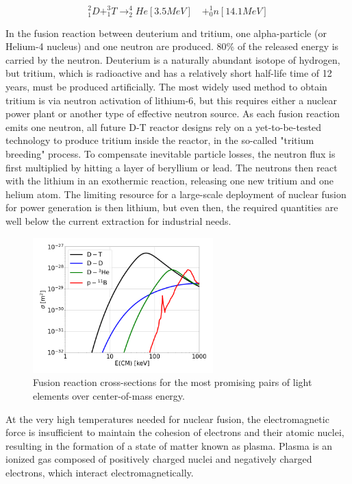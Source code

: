 \begin{equation}
	^2_1D + ^3_1T \rightarrow ^4_2He [3.5MeV] \quad + ^1_0n [14.1 MeV]
\end{equation}

In the fusion reaction between deuterium and tritium, one alpha-particle (or Helium-4 nucleus) and one neutron are produced. 80\% of the released energy is carried by the neutron. Deuterium is a naturally abundant isotope of hydrogen, but tritium, which is radioactive and has a relatively short half-life time of 12 years, must be produced artificially. The most widely used method to obtain tritium is via neutron activation of lithium-6, but this requires either a nuclear power plant or another type of effective neutron source. As each fusion reaction emits one neutron, all future D-T reactor designs rely on a yet-to-be-tested technology to produce tritium inside the reactor, in the so-called "tritium breeding" process. To compensate inevitable particle losses, the neutron flux is first multiplied by hitting a layer of beryllium or lead. The neutrons then react with the lithium in an exothermic reaction, releasing one new tritium and one helium atom. The limiting resource for a large-scale deployment of nuclear fusion for power generation is then lithium, but even then, the required quantities are well below the current extraction for industrial needs. \\


\begin{figure}[H]
	\centering
	\includegraphics[width=0.62\textwidth]{schemes/fusion-xsecs2.png}
	\caption{Fusion reaction cross-sections for the most promising pairs of light elements over center-of-mass energy.}
	\label{fig:Intro_fusionCrossSections}
\end{figure}


At the very high temperatures needed for nuclear fusion, the electromagnetic force is insufficient to maintain the cohesion of electrons and their atomic nuclei, resulting in the formation of a state of matter known as plasma. Plasma is an ionized gas composed of positively charged nuclei and negatively charged electrons, which interact electromagnetically. \newline


